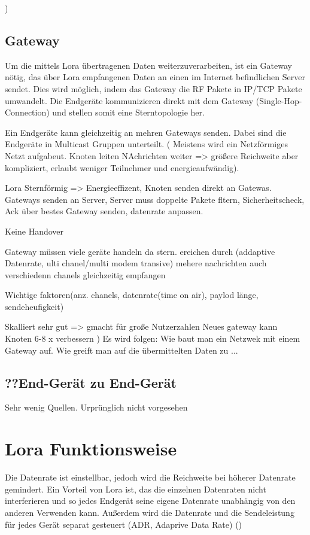 \documentclass[a4paper,12pt]{article}
\begin{document}
    )
    \subsection{Gateway}
    Um die mittels Lora übertragenen Daten weiterzuverarbeiten, ist ein Gateway nötig, das über Lora empfangenen Daten an einen im Internet befindlichen Server sendet. Dies wird möglich, indem das Gateway die RF Pakete in IP/TCP Pakete umwandelt.
    Die Endgeräte kommunizieren direkt mit dem Gateway (Single-Hop-Connection) und stellen somit eine Sterntopologie her.

    Ein Endgeräte kann gleichzeitig an mehren Gateways senden. Dabei sind die Endgeräte in Multicast Gruppen unterteilt.
        \cite{TheThing}
        \cite{WhatIsLoRa}(
            Meistens wird ein Netzförmiges Netzt aufgabeut. Knoten leiten NAchrichten weiter => größere Reichweite aber kompliziert, erlaubt weniger Teilnehmer und energieaufwändig). 

            Lora Sternförmig => Energieeffizent, Knoten senden direkt an Gatewas. Gateways senden an Server, Server muss doppelte Pakete fltern, Sicherheitscheck, Ack über bestes Gateway senden, datenrate anpassen.

            Keine Handover

            Gateway müssen viele geräte handeln da stern. ereichen durch (addaptive Datenrate, ulti chanel/multi modem transive) mehere nachrichten auch verschiedenn chanels gleichzeitig empfangen

            Wichtige faktoren(anz. chanels, datenrate(time on air), paylod länge, sendeheufigkeit)
        
            Skalliert sehr gut => gmacht für große Nutzerzahlen
            Neues gateway kann Knoten 6-8 x verbessern
            )
        \cite{LoRaSpec}
        \cite{RFC8376}
    \newline{}\newline{} Es wird folgen: Wie baut man ein Netzwek mit einem Gateway auf. Wie greift man auf die übermittelten Daten zu ...
    \subsection{??End-Gerät zu End-Gerät}
    Sehr wenig Quellen. Urprünglich nicht vorgesehen
    \section{Lora Funktionsweise}
    Die Datenrate ist einstellbar, jedoch wird die Reichweite bei höherer Datenrate gemindert. Ein Vorteil von Lora ist, das die einzelnen Datenraten nicht interferieren und so jedes Endgerät seine eigene Datenrate unabhängig von den anderen Verwenden kann.
    Außerdem wird die Datenrate und die Sendeleistung für jedes Gerät separat gesteuert (ADR, Adaprive Data Rate)
        \cite{RFC8376}
        \cite{LoRaSpec}
        \cite{WhatIsLoRa}()
\end{document}
